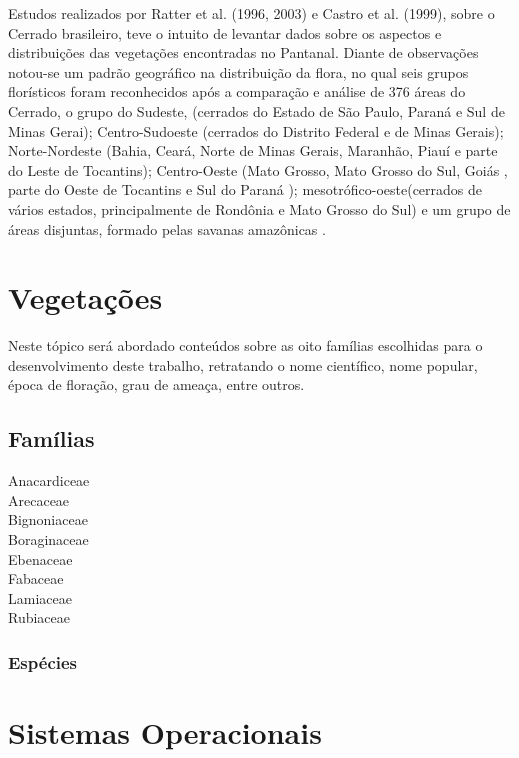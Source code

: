 			Estudos realizados por  Ratter et al. (1996, 2003) e Castro et al. (1999), sobre o Cerrado brasileiro, teve o intuito de levantar dados sobre os aspectos e distribuições das vegetações encontradas no Pantanal. Diante de observações notou-se um padrão geográfico na distribuição da flora, no qual seis grupos florísticos foram reconhecidos após a comparação e análise de 376 áreas do Cerrado, o grupo do Sudeste, (cerrados do Estado de São Paulo, Paraná e Sul de Minas Gerai); Centro-Sudoeste (cerrados do Distrito Federal e de Minas Gerais); Norte-Nordeste (Bahia, Ceará, Norte de Minas Gerais, Maranhão, Piauí e parte do Leste de Tocantins); Centro-Oeste (Mato Grosso, Mato Grosso do Sul, Goiás , parte do Oeste de Tocantins e Sul do Paraná ); mesotrófico-oeste(cerrados de vários estados, principalmente de Rondônia e Mato Grosso do Sul) e um grupo de áreas disjuntas, formado pelas savanas amazônicas \cite{souza2006origem}.
		
	
\section{Vegetações}

	Neste tópico será abordado conteúdos sobre as oito famílias escolhidas para o desenvolvimento deste trabalho, retratando o nome científico, nome popular, época de floração, grau de ameaça, entre outros.

	\subsection{Famílias}
	
		\begin{description}
			\item[Anacardiceae]
			\item[Arecaceae] 
			\item[Bignoniaceae]
			\item[Boraginaceae]
			\item[Ebenaceae]
			\item[Fabaceae]
			\item[Lamiaceae]
			\item[Rubiaceae]
			
		\end{description}
	
	
		\subsubsection{Espécies}
		
\section{Sistemas Operacionais}
		
